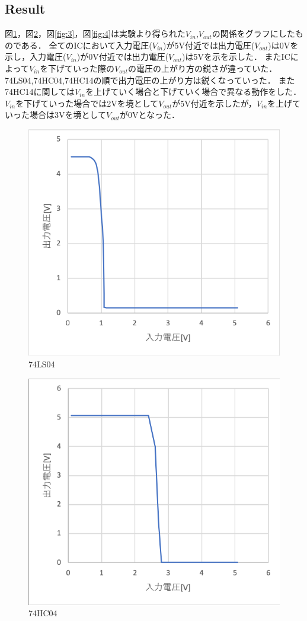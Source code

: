 \documentclass[11pt, a4paper,twocolumn]{jarticle}
\begin{document}
\subsection{Result}
図\ref{fig:1}，図\ref{fig:2}，図\ref{fig:3}，図\ref{fig:4}は実験より得られた$V_{in}$,$V_{out}$の関係をグラフにしたものである．
全てのICにおいて入力電圧($V_{in}$)が5V付近では出力電圧($V_{out}$)は0Vを示し，入力電圧($V_{in}$)が0V付近では出力電圧($V_{out}$)は5Vを示を示した．
またICによって$V_{in}$を下げていった際の$V_{out}$の電圧の上がり方の鋭さが違っていた．74LS04,74HC04,74HC14の順で出力電圧の上がり方は鋭くなっていった．
また74HC14に関しては$V_{in}$を上げていく場合と下げていく場合で異なる動作をした．
$V_{in}$を下げていった場合では2Vを境として$V_{out}$が5V付近を示したが，$V_{in}$を上げていった場合は3Vを境として$V_{out}$が0Vとなった．
\begin{figure}[htbp]
 \begin{center}
  \includegraphics[width=0.8\linewidth]{fig1.png}
 \end{center}
 \caption{74LS04}
 \label{fig:1}
\end{figure}

\begin{figure}[htbp]
 \begin{center}
  \includegraphics[width=0.7\linewidth]{fig2.png}
 \end{center}
 \caption{74HC04}
 \label{fig:2}
\end{figure}
\end{document}
